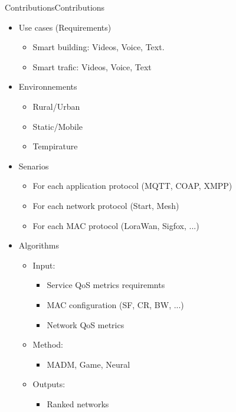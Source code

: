 \begin{frame}{Contributions}{Contributions}


\begin{itemize}
	\item Use cases (Requirements)
	\begin{itemize}
		\item Smart building: Videos, Voice, Text. 
		\item Smart trafic: Videos, Voice, Text
	\end{itemize}
\end{itemize}


\begin{itemize}
	\item Environnements
	\begin{itemize}
		\item Rural/Urban
		\item Static/Mobile
		\item Tempirature
	\end{itemize}
\end{itemize}

\begin{itemize}
	\item Senarios
	\begin{itemize}
		\item For each application protocol (MQTT, COAP, XMPP)
		\item For each network protocol (Start, Mesh)
		\item For each MAC protocol (LoraWan, Sigfox, ...)
	\end{itemize}
\end{itemize}

\begin{itemize}
	\item Algorithms
	\begin{itemize}
		\item Input:
		\begin{itemize}
			\item Service QoS metrics requiremnts
			\item MAC configuration (SF, CR, BW, ...)
			\item Network QoS metrics
		\end{itemize}


		\item Method:
		\begin{itemize}
			\item MADM, Game, Neural
		\end{itemize}

			\item Outputs:
		\begin{itemize}
			\item Ranked networks
		\end{itemize}
	\end{itemize}
\end{itemize}


\end{frame}
